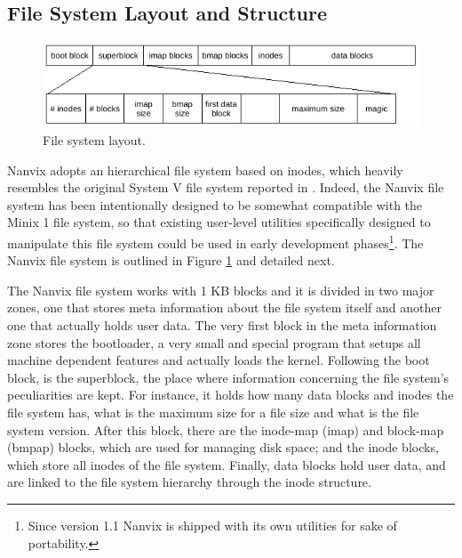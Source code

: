 	\subsection{File System Layout and Structure}
	\label{subsection: file system layout and structure}

	\begin{figure}
		\centering
		\includegraphics[scale=1.05]{img/file-system-layout}
		\caption{File system layout.}
		\label{figure: file system layout}
	\end{figure}

	Nanvix adopts an hierarchical file system based on inodes, which
	heavily resembles the original System V file system reported in
	\cite{Bach:86}. Indeed, the Nanvix file system has been
	intentionally designed to be somewhat compatible with the Minix 1
	file system, so that existing user-level utilities specifically
	designed to manipulate this file system could be used in early
	development phases\footnote{Since version 1.1 Nanvix is shipped with
	its own utilities for sake of portability.}. The Nanvix file system
	is outlined in Figure \ref{figure: file system layout} and detailed
	next.

	The Nanvix file system works with 1 KB blocks and it is divided in
	two major zones, one that stores meta information about the file
	system itself and another one that actually holds user data. The
	very first block in the meta information zone stores the bootloader,
	a very small and special program that setups all machine dependent
	features and actually loads the kernel. Following the boot block, is
	the superblock, the place where information concerning the file
	system's peculiarities are kept. For instance, it holds how many
	data blocks and inodes the file system has, what is the maximum size
	for a file size and what is the file system version. After this
	block, there are the inode-map (imap) and block-map (bmpap) blocks,
	which are used for managing disk space; and the inode blocks, which
	store all inodes of the file system. Finally, data blocks hold user
	data, and are linked to the file system hierarchy through the inode
	structure.

